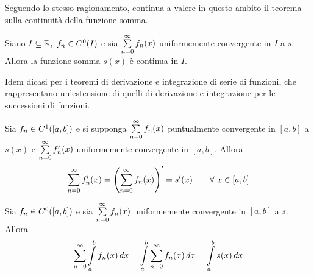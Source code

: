 Seguendo lo stesso ragionamento, continua a valere in questo ambito il teorema sulla continuità della funzione somma.
\begin{theorem}
    Siano $I \subseteq \mathbb{R},\ f_n \in C^0(I)$ e sia $\sum\limits_{n=0}^{\infty}{f_n(x)}$ uniformemente convergente in $I$ a $s$. Allora la funzione somma $s(x)$ è continua in $I$.
\end{theorem}
Idem dicasi per i teoremi di derivazione e integrazione di serie di funzioni, che rappresentano un'estensione di quelli di derivazione e integrazione per le successioni di funzioni.
\begin{theorem}
    Sia $f_n \in C^1([a,b])$ e si supponga $\sum\limits_{n=0}^{\infty}{f_n(x)}$ puntualmente convergente in $[a,b]$ a $s(x)$ e $\sum\limits_{n=0}^{\infty}{f_n'(x)}$ uniformemente convergente in $[a,b]$. Allora
    \begin{equation}
        \sum\limits_{n=0}^{\infty}{f_n'(x)}= 
        \left(\sum\limits_{n=0}^{\infty}{f_n(x)}\right)'= s'(x) \qquad \forall\ x \in [a,b]
    \end{equation}
\end{theorem}
\begin{theorem}
    Sia $f_n \in C^0([a,b])$ e sia $\sum\limits_{n=0}^{\infty}{f_n(x)}$ uniformemente convergente in $[a,b]$ a $s$. Allora
    \begin{equation}
        \sum\limits_{n=0}^{\infty}{\int\limits_{a}^{b}{f_n(x)}\, dx}= \int\limits_{a}^{b}{\sum\limits_{n=0}^{\infty}{f_n(x)}\, dx}= \int\limits_{a}^{b}{s(x)}\, dx
    \end{equation}
\end{theorem}
